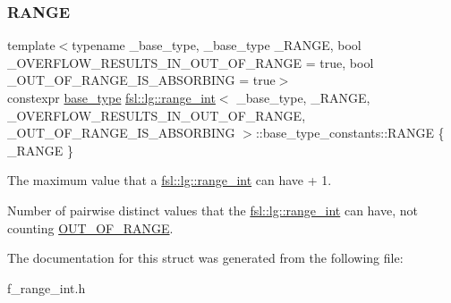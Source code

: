 \subsubsection{\texorpdfstring{RANGE}{RANGE}}
{\footnotesize\ttfamily template$<$typename \+\_\+base\+\_\+type, \+\_\+base\+\_\+type \+\_\+\+R\+A\+N\+GE, bool \+\_\+\+O\+V\+E\+R\+F\+L\+O\+W\+\_\+\+R\+E\+S\+U\+L\+T\+S\+\_\+\+I\+N\+\_\+\+O\+U\+T\+\_\+\+O\+F\+\_\+\+R\+A\+N\+GE = true, bool \+\_\+\+O\+U\+T\+\_\+\+O\+F\+\_\+\+R\+A\+N\+G\+E\+\_\+\+I\+S\+\_\+\+A\+B\+S\+O\+R\+B\+I\+NG = true$>$ \\
constexpr \mbox{\hyperlink{classfsl_1_1lg_1_1range__int_a4ce67cd216fd303b7bae83a7cbcab3bb}{base\+\_\+type}} \mbox{\hyperlink{classfsl_1_1lg_1_1range__int}{fsl\+::lg\+::range\+\_\+int}}$<$ \+\_\+base\+\_\+type, \+\_\+\+R\+A\+N\+GE, \+\_\+\+O\+V\+E\+R\+F\+L\+O\+W\+\_\+\+R\+E\+S\+U\+L\+T\+S\+\_\+\+I\+N\+\_\+\+O\+U\+T\+\_\+\+O\+F\+\_\+\+R\+A\+N\+GE, \+\_\+\+O\+U\+T\+\_\+\+O\+F\+\_\+\+R\+A\+N\+G\+E\+\_\+\+I\+S\+\_\+\+A\+B\+S\+O\+R\+B\+I\+NG $>$\+::base\+\_\+type\+\_\+constants\+::\+R\+A\+N\+GE \{ \+\_\+\+R\+A\+N\+GE \}\hspace{0.3cm}{\ttfamily [static]}}



The maximum value that a \mbox{\hyperlink{classfsl_1_1lg_1_1range__int}{fsl\+::lg\+::range\+\_\+int}} can have + 1. 

Number of pairwise distinct values that the \mbox{\hyperlink{classfsl_1_1lg_1_1range__int}{fsl\+::lg\+::range\+\_\+int}} can have, not counting \mbox{\hyperlink{structfsl_1_1lg_1_1range__int_1_1base__type__constants_a6eff6ff6b35cce82a6eb816c1312f64a}{O\+U\+T\+\_\+\+O\+F\+\_\+\+R\+A\+N\+GE}}. 

The documentation for this struct was generated from the following file\+:\begin{DoxyCompactItemize}
\item 
f\+\_\+range\+\_\+int.\+h\end{DoxyCompactItemize}
